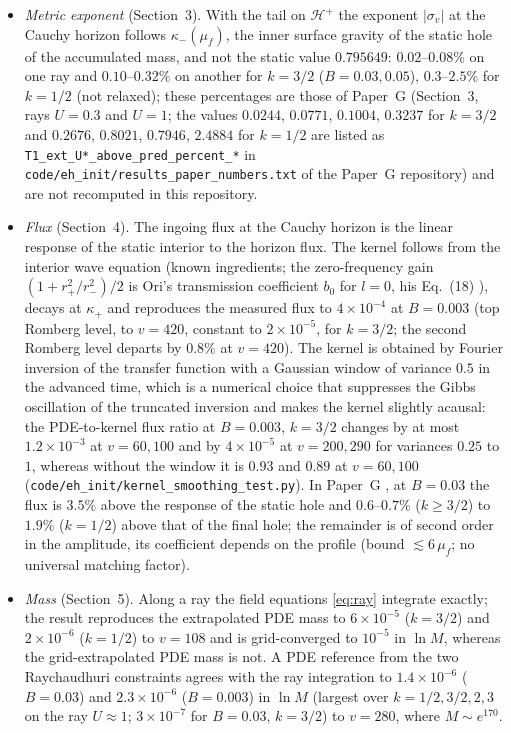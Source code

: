 \documentclass[11pt]{article}
\newcommand{\Gehdatan}{3}\newcommand{\Gkernelnum}{4}\newcommand{\Gshelln}{4.7}\newcommand{\Grayn}{5}
\begin{document}
\begin{itemize}
\item \emph{Metric exponent} (Section~\Gehdatan{}). With the tail on $\mathcal H^+$ the exponent $|\sigma_v|$ at the Cauchy horizon follows $\kappa_-(\mu_f)$, the inner surface gravity of the static hole of the accumulated mass, and not the static value $0.795649$: $0.02$--$0.08\%$ on one ray and $0.10$--$0.32\%$ on another for $k=3/2$ ($B=0.03,0.05$), $0.3$--$2.5\%$ for $k=1/2$ (not relaxed); these percentages are those of Paper~G \citep{PaperG} (Section~\Gehdatan{}, rays $U=0.3$ and $U=1$; the values $0.0244$, $0.0771$, $0.1004$, $0.3237$ for $k=3/2$ and $0.2676$, $0.8021$, $0.7946$, $2.4884$ for $k=1/2$ are listed as \texttt{T1\_ext\_U*\_above\_pred\_percent\_*} in \texttt{code/eh\_init/results\_paper\_numbers.txt} of the Paper~G repository) and are not recomputed in this repository.
\item \emph{Flux} (Section~\Gkernelnum{}). The ingoing flux at the Cauchy horizon is the linear response of the static interior to the horizon flux. The kernel follows from the interior wave equation (known ingredients; the zero-frequency gain $(1+r_+^2/r_-^2)/2$ is Ori's transmission coefficient $b_0$ for $l=0$, his Eq.~(18) \citep{Ori1998}), decays at $\kappa_+$ and reproduces the measured flux to $4\times10^{-4}$ at $B=0.003$ (top Romberg level, to $v=420$, constant to $2\times10^{-5}$, for $k=3/2$; the second Romberg level departs by $0.8\%$ at $v=420$). The kernel is obtained by Fourier inversion of the transfer function with a Gaussian window of variance $0.5$ in the advanced time, which is a numerical choice that suppresses the Gibbs oscillation of the truncated inversion and makes the kernel slightly acausal: the PDE-to-kernel flux ratio at $B=0.003$, $k=3/2$ changes by at most $1.2\times10^{-3}$ at $v=60,100$ and by $4\times10^{-5}$ at $v=200,290$ for variances $0.25$ to $1$, whereas without the window it is $0.93$ and $0.89$ at $v=60,100$ (\texttt{code/eh\_init/kernel\_smoothing\_test.py}). In Paper~G \citep{PaperG}, at $B=0.03$ the flux is $3.5\%$ above the response of the static hole and $0.6$--$0.7\%$ ($k\ge3/2$) to $1.9\%$ ($k=1/2$) above that of the final hole; the remainder is of second order in the amplitude, its coefficient depends on the profile (bound $\lesssim6\,\mu_f$; no universal matching factor).
\item \emph{Mass} (Section~\Grayn{}). Along a ray the field equations \eqref{eq:ray} integrate exactly; the result reproduces the extrapolated PDE mass to $6\times10^{-5}$ ($k=3/2$) and $2\times10^{-6}$ ($k=1/2$) to $v=108$ and is grid-converged to $10^{-5}$ in $\ln M$, whereas the grid-extrapolated PDE mass is not. A PDE reference from the two Raychaudhuri constraints agrees with the ray integration to $1.4\times10^{-6}$ ($B=0.03$) and $2.3\times10^{-6}$ ($B=0.003$) in $\ln M$ (largest over $k=1/2,3/2,2,3$ on the ray $U\approx1$; $3\times10^{-7}$ for $B=0.03$, $k=3/2$) to $v=280$, where $M\sim e^{170}$.

\end{itemize}
\end{document}
